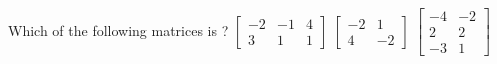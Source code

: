 \begin{activity}
Which of the following matrices is ?
{\(\begin{bmatrix} -2&-1&4\\3&1&1 \end{bmatrix}\)}
{\(\begin{bmatrix} -2&1\\4&-2 \end{bmatrix}\)}
{\(\begin{bmatrix} -4&-2\\2&2\\-3&1 \end{bmatrix}\)}
\end{activity}



